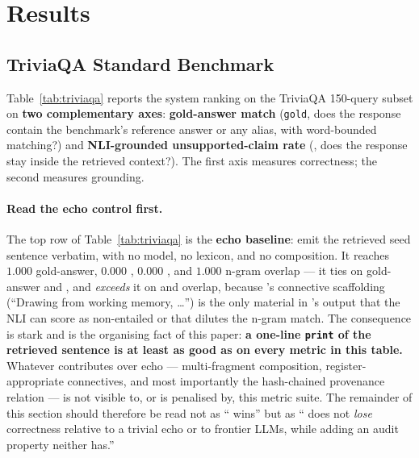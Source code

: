 \section{Results}
\label{sec:results}

\subsection{TriviaQA Standard Benchmark}
\label{sec:results-triviaqa}

Table~\ref{tab:triviaqa} reports the system ranking on the
TriviaQA 150-query subset on \textbf{two complementary axes}:
\textbf{gold-answer match} (\texttt{gold}, does the response
contain the benchmark's reference answer or any alias, with
word-bounded matching?) and \textbf{NLI-grounded unsupported-claim
rate} (\unsupf, does the response stay inside the retrieved
context?). The first axis measures correctness; the second
measures grounding.

\paragraph{Read the echo control first.} The top row of
Table~\ref{tab:triviaqa} is the \textbf{echo baseline}: emit the
retrieved seed sentence verbatim, with no model, no lexicon, and
no composition. It reaches $1.000$ gold-answer, $0.000$ \unsupf{},
$0.000$ \unsupr{}, and $1.000$ n-gram overlap --- it ties
\hyphae{} on gold-answer and \unsupf{}, and \emph{exceeds} it on
\unsupr{} and overlap, because \hyphae{}'s connective scaffolding
(``Drawing from working memory, \ldots'') is the only material in
\hyphae{}'s output that the NLI can score as non-entailed or that
dilutes the n-gram match. The consequence is stark and is the
organising fact of this paper: \textbf{a one-line \texttt{print}
of the retrieved sentence is at least as good as \hyphae{} on
every metric in this table.} Whatever \hyphae{} contributes over
echo --- multi-fragment composition, register-appropriate
connectives, and most importantly the hash-chained provenance
relation --- is not visible to, or is penalised by, this metric
suite. The remainder of this section should therefore be read not
as ``\hyphae{} wins'' but as ``\hyphae{} does not \emph{lose}
correctness relative to a trivial echo or to frontier LLMs, while
adding an audit property neither has.''

